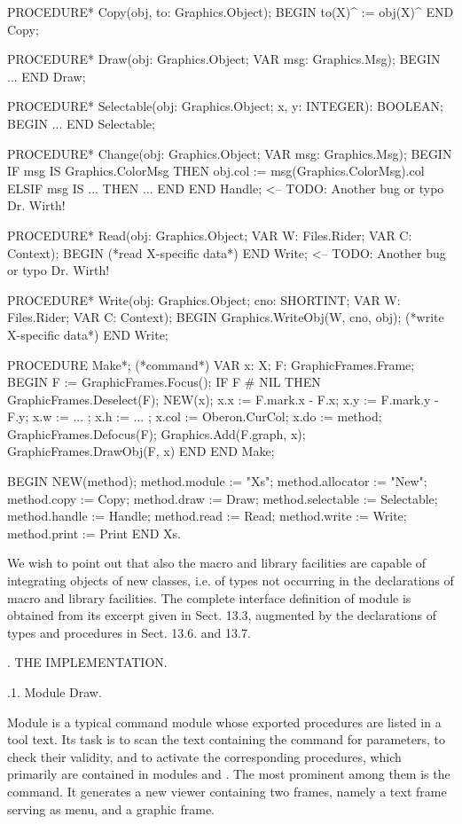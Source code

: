   PROCEDURE* Copy(obj, to: Graphics.Object);
  BEGIN to(X)^ := obj(X)^
  END Copy;

  PROCEDURE* Draw(obj: Graphics.Object; VAR msg: Graphics.Msg);
  BEGIN ...
  END Draw;
  
  PROCEDURE* Selectable(obj: Graphics.Object;
                        x, y: INTEGER): BOOLEAN;
  BEGIN ...
  END Selectable;
  
  PROCEDURE* Change(obj: Graphics.Object;
                    VAR msg: Graphics.Msg);
  BEGIN
    IF msg IS Graphics.ColorMsg
    THEN obj.col := msg(Graphics.ColorMsg).col
    ELSIF msg IS ... THEN ...
    END
  END Handle; <-- TODO: Another bug or typo Dr. Wirth!
  
  PROCEDURE* Read(obj: Graphics.Object; VAR W: Files.Rider;
    VAR C: Context);
  BEGIN (*read X-specific data*)
  END Write; <-- TODO: Another bug or typo Dr. Wirth!
    
  PROCEDURE* Write(obj: Graphics.Object; cno: SHORTINT;
    VAR W: Files.Rider; VAR C: Context);
  BEGIN Graphics.WriteObj(W, cno, obj); (*write X-specific data*)
  END Write;
  
  PROCEDURE Make*; (*command*)
  VAR x: X; F: GraphicFrames.Frame;
  BEGIN
    F := GraphicFrames.Focus();
    IF F # NIL THEN
      GraphicFrames.Deselect(F);
      NEW(x);
      x.x := F.mark.x - F.x;
      x.y := F.mark.y - F.y;
      x.w := ... ;
      x.h := ... ;
      x.col := Oberon.CurCol;
      x.do := method;
      GraphicFrames.Defocus(F);
      Graphics.Add(F.graph, x);
      GraphicFrames.DrawObj(F, x)
    END
  END Make;

BEGIN
  NEW(method);
  method.module := "Xs";
  method.allocator := "New";
  method.copy := Copy;
  method.draw := Draw;
  method.selectable := Selectable;
  method.handle := Handle;
  method.read := Read;
  method.write := Write;
  method.print := Print
END Xs.
\endtt

We wish to point out that also the macro and library facilities are capable of integrating objects of new classes, i.e. of types not occurring in the declarations of macro and library facilities. The complete interface definition of module  is obtained from its excerpt given in Sect. 13.3, augmented by the declarations of types and procedures in Sect. 13.6. and 13.7.

. THE IMPLEMENTATION.

.1. Module Draw.

Module  is a typical command module whose exported procedures are listed in a tool text. Its task is to scan the text containing the command for parameters, to check their validity, and to activate the corresponding procedures, which primarily are contained in modules  and . The most prominent among them is the  command. It generates a new viewer containing two frames, namely a text frame serving as menu, and a graphic frame.

